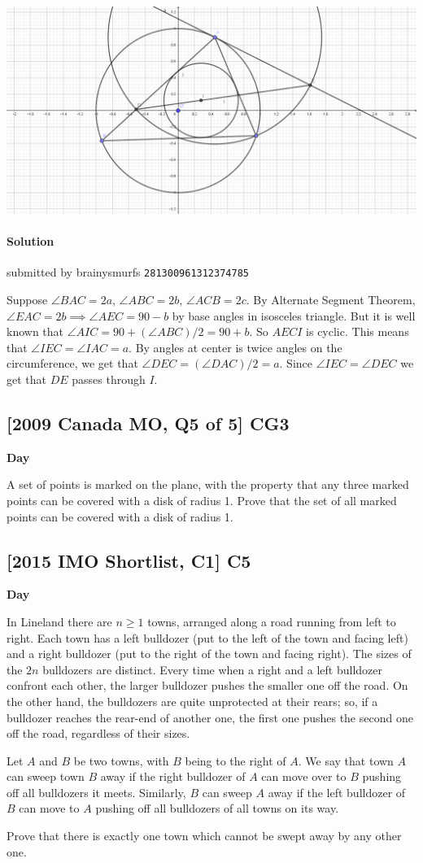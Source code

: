 \documentclass[10pt]{article}
\newcommand{\themonth}{March}
\newcommand{\theyear}{2019}
\newcounter{day}
\newcounter{solution}
\newcounter{datenumber}
\newcommand{\problem}[4][0]{
	\newpage
	\subsection{[#3] \space #2} \hfill 
	{\large\textbf{Day \arabic{day}}} %
	\begin{flushleft} #4 \end{flushleft}
	\vspace{1em}
	\addtocounter{day}{1}
	\addtocounter{datenumber}{1}
	\setcounter{solution}{1}
}
\newcommand{\solution}[4][0]{
	\paragraph{Solution \arabic{solution}} \hfill submitted by #2 \hfill \texttt{#3}
	\begin{flushleft} #4 \end{flushleft}
	\addtocounter{solution}{1}
	\vspace{1em}
}
\begin{document}
\begin{center}
	\includegraphics[scale=0.25]{q47-diagram}
\end{center}

\solution[47]{brainysmurfs}{281300961312374785}{Suppose $\angle BAC = 2a$, $\angle ABC = 2b$, $\angle ACB = 2c$. By Alternate Segment Theorem, $\angle EAC = 2b \implies \angle AEC = 90 - b$ by base angles in isosceles triangle. But it is well known that $\angle AIC = 90 + (\angle ABC)/2 = 90 + b$. So $AECI$ is cyclic. This means that $\angle IEC = \angle IAC = a$. By angles at center is twice angles on the circumference, we get that $\angle DEC = (\angle DAC)/2 = a$. Since $\angle IEC = \angle DEC$ we get that $DE$ passes through $I$.}

\problem[48]{CG3}{2009 Canada MO, Q5 of 5}{A set of points is marked on the plane, with the property that any three marked points can be covered with a disk of radius 1. Prove that the set of all marked points can be covered with a disk of radius 1.}

\problem[49]{C5}{2015 IMO Shortlist, C1}{In Lineland there are \(n \geq 1\) towns, arranged along a road running from left to right. Each town has a left bulldozer (put to the left of the town and facing left) and a right bulldozer (put to the right of the town and facing right). The sizes of the \(2n\) bulldozers are distinct. Every time when a right and a left bulldozer confront each other, the larger bulldozer pushes the smaller one off the road. On the other hand, the bulldozers are quite unprotected at their rears; so, if a bulldozer reaches the rear-end of another one, the first one pushes the second one off the road, regardless of their sizes.
	
	\quad Let \(A\) and \(B\) be two towns, with \(B\) being to the right of \(A\). We say that town \(A\) can sweep town \(B\) away if the right bulldozer of \(A\) can move over to \(B\) pushing off all bulldozers it meets. Similarly, \(B\) can sweep \(A\) away if the left bulldozer of \(B\) can move to \(A\) pushing off all bulldozers of all towns on its way.
	
	\quad Prove that there is exactly one town which cannot be swept away by any other one.}
\end{document}
